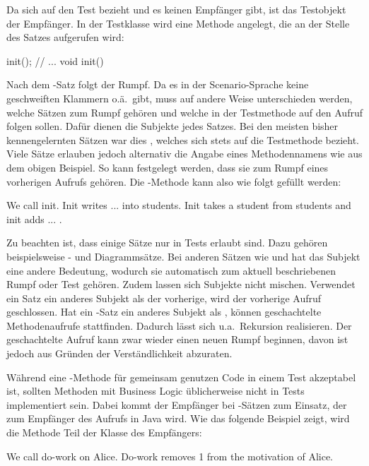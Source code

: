 Da sich  auf den Test bezieht und es keinen Empfänger gibt, ist das Testobjekt der Empfänger.
In der Testklasse wird eine Methode  angelegt, die an der Stelle des Satzes aufgerufen wird:

\begin{jcodeblock}
    init();
    // ...
    void init() {
    }
\end{jcodeblock}

Nach dem -Satz folgt der Rumpf.
Da es in der Scenario-Sprache keine geschweiften Klammern o.ä.\ gibt,
muss auf andere Weise unterschieden werden, welche Sätzen zum Rumpf gehören
und welche in der Testmethode auf den Aufruf folgen sollen.
Dafür dienen die Subjekte jedes Satzes.
Bei den meisten bisher kennengelernten Sätzen war dies , welches sich stets auf die Testmethode bezieht.
Viele Sätze erlauben jedoch alternativ die Angabe eines Methodennamens wie  aus dem obigen Beispiel.
So kann festgelegt werden, dass sie zum Rumpf eines vorherigen Aufrufs gehören.
Die -Methode kann also wie folgt gefüllt werden:

\begin{codeblock}
    We call init.
    Init writes ... into students.
    Init takes a student from students and init adds ... .
\end{codeblock}

Zu beachten ist, dass einige Sätze nur in Tests erlaubt sind.
Dazu gehören beispielsweise - und Diagrammsätze.
Bei anderen Sätzen wie  und  hat das Subjekt eine andere Bedeutung,
wodurch sie automatisch zum aktuell beschriebenen Rumpf oder Test gehören.
Zudem lassen sich Subjekte nicht mischen.
Verwendet ein Satz ein anderes Subjekt als der vorherige, wird der vorherige Aufruf geschlossen.
Hat ein -Satz ein anderes Subjekt als , können geschachtelte Methodenaufrufe stattfinden.
Dadurch lässt sich u.a.\ Rekursion realisieren.
Der geschachtelte Aufruf kann zwar wieder einen neuen Rumpf beginnen, davon ist jedoch aus Gründen der Verständlichkeit abzuraten.

Während eine -Methode für gemeinsam genutzen Code in einem Test akzeptabel ist,
sollten Methoden mit Business Logic üblicherweise nicht in Tests implementiert sein.
Dabei kommt der Empfänger bei -Sätzen zum Einsatz, der zum Empfänger des Aufrufs in Java wird.
Wie das folgende Beispiel zeigt, wird die Methode Teil der Klasse des Empfängers:

\begin{codeblock}
    We call do-work on Alice.
    Do-work removes 1 from the motivation of Alice.
\end{codeblock}


